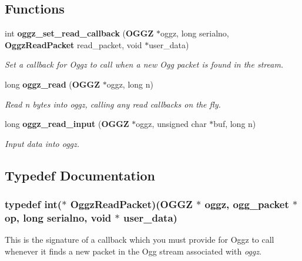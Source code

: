 \subsection*{Functions}
\begin{CompactItemize}
\item 
int {\bf oggz\_\-set\_\-read\_\-callback} ({\bf OGGZ} $\ast$oggz, long serialno, {\bf Oggz\-Read\-Packet} read\_\-packet, void $\ast$user\_\-data)
\begin{CompactList}\small\item\em Set a callback for Oggz to call when a new Ogg packet is found in the stream. \item\end{CompactList}\item 
long {\bf oggz\_\-read} ({\bf OGGZ} $\ast$oggz, long n)
\begin{CompactList}\small\item\em Read n bytes into {\em oggz\/}, calling any read callbacks on the fly. \item\end{CompactList}\item 
long {\bf oggz\_\-read\_\-input} ({\bf OGGZ} $\ast$oggz, unsigned char $\ast$buf, long n)
\begin{CompactList}\small\item\em Input data into {\em oggz\/}. \item\end{CompactList}\end{CompactItemize}


\subsection{Typedef Documentation}
\subsubsection{\setlength{\rightskip}{0pt plus 5cm}typedef int($\ast$ {\bf Oggz\-Read\-Packet})({\bf OGGZ} $\ast$ oggz, ogg\_\-packet $\ast$ op, long serialno, void $\ast$ user\_\-data)}\label{group__read__api_a0}


This is the signature of a callback which you must provide for Oggz to call whenever it finds a new packet in the Ogg stream associated with {\em oggz\/}. 

